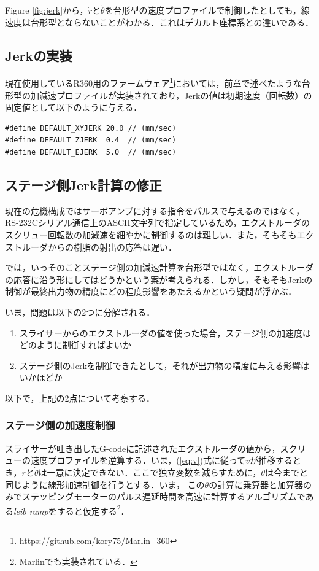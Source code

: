 \documentclass[twocolumn,oneside,a4paper]{article}
\begin{document}
Figure \ref{fig:jerk}から，$\dot{r}$と$\dot{\theta}$を台形型の速度プロファイルで制御したとしても，線速度は台形型とならないことがわかる．これはデカルト座標系との違いである．

\subsection{Jerkの実装}
現在使用しているR360用のファームウェア\footnote{https://github.com/kory75/Marlin\_360}においては，前章で述べたような台形型の加減速プロファイルが実装されており，Jerkの値は初期速度（回転数）の固定値として以下のように与える．
{\small
\begin{verbatim}
#define DEFAULT_XYJERK 20.0 // (mm/sec)
#define DEFAULT_ZJERK  0.4  // (mm/sec)
#define DEFAULT_EJERK  5.0  // (mm/sec)
\end{verbatim}}

\subsection{ステージ側Jerk計算の修正}
現在の危機構成ではサーボアンプに対する指令をパルスで与えるのではなく，RS-232Cシリアル通信上のASCII文字列で指定しているため，エクストルーダのスクリュー回転数の加減速を細やかに制御するのは難しい．また，そもそもエクストルーダからの樹脂の射出の応答は遅い．

では，いっそのことステージ側の加減速計算を台形型ではなく，エクストルーダの応答に沿う形にしてはどうかという案が考えられる．しかし，そもそもJerkの制御が最終出力物の精度にどの程度影響をあたえるかという疑問が浮かぶ．

いま，問題は以下の2つに分解される．

\begin{enumerate}
     \item スライサーからのエクストルーダの値を使った場合，ステージ側の加速度はどのように制御すればよいか
     \item ステージ側のJerkを制御できたとして，それが出力物の精度に与える影響はいかほどか    
\end{enumerate}

以下で，上記の2点について考察する．

\subsubsection{ステージ側の加速度制御}
スライサーが吐き出したG-codeに記述されたエクストルーダの値から，スクリューの速度プロファイルを逆算する．いま，(\ref{eq:v})式に従って$v$が推移するとき，$\dot{r}$と$\dot{\theta}$は一意に決定できない．ここで独立変数を減らすために，$\theta$は今までと同じように線形加速制御を行うとする．いま， この$\theta$の計算に乗算器と加算器のみでステッピングモーターのパルス遅延時間を高速に計算するアルゴリズムである{\it leib ramp}\cite{leib}をすると仮定する\footnote{Marlinでも実装されている．}．
\end{document}

